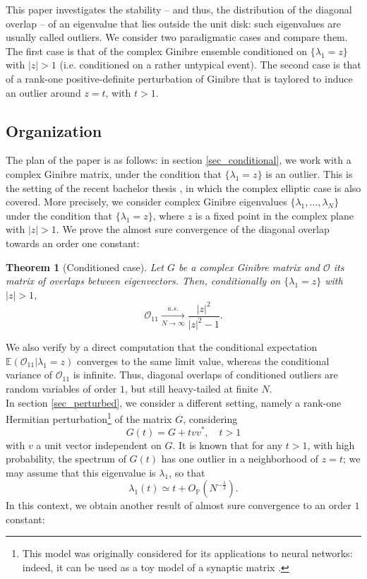 \documentclass[12pt,a4paper]{amsart}
\theoremstyle{plain} %
\newtheorem{theorem}{Theorem}
\newcommand{\E}{\mathbb{E}}
\newcommand{\PP}{\mathbb{P}}
\newcommand{\Ov}{\mathscr{O}}
\newcommand{\la}{\lambda}
\begin{document}
This paper investigates the stability -- and thus, the distribution of the diagonal overlap -- of an eigenvalue that lies outside the unit disk: such eigenvalues are usually called outliers. We consider two paradigmatic cases and compare them. The first case is that of the complex Ginibre ensemble conditioned on $\{ \la_1 = z \}$ with $|z|>1$ (i.e. conditioned on a rather untypical event). The second case is that of a rank-one positive-definite perturbation of Ginibre that is taylored to induce an outlier around $z=t$, with $t>1$. \\

\subsection{Organization}
The plan of the paper is as follows:
in section \ref{sec_conditional}, we work with a complex Ginibre matrix, under the condition that $\{\la_1=z\}$ is an outlier. This is the setting of the recent bachelor thesis \cite{Thomas2026}, in which the complex elliptic case is also covered. More precisely, we consider complex Ginibre eigenvalues $\{ \la_1, \dots, \la_N \}$ under the condition that $\{ \la_1 = z \}$, where $z$ is a fixed point in the complex plane with $|z|>1$. We prove the almost sure convergence of the diagonal overlap towards an order one constant:

\begin{theorem}[Conditioned case]\label{thm_conditional}
    Let $G$ be a complex Ginibre matrix and $\Ov$ its matrix of overlaps between eigenvectors. Then, conditionally on $\{\la_1 = z\}$ with $|z|>1$, 
    $$
    \mathscr{O}_{11} \xrightarrow[N \rightarrow \infty]{a.s.} \frac{|z|^2}{|z|^2-1}.
    $$
\end{theorem}
We also verify by a direct computation that the conditional expectation $\E \left( \Ov_{11} | \la_1 = z \right)$ converges to the same limit value, whereas the conditional variance of $\Ov_{11}$ is infinite. Thus, diagonal overlaps of conditioned outliers are random variables of order $1$, but still heavy-tailed at finite $N$. \\

In section \ref{sec_perturbed}, we consider a different setting, namely a rank-one Hermitian perturbation\footnote{This model was originally considered for its applications to neural networks: indeed, it can be used as a toy model of a synaptic matrix \cite{RajanAbbott}.} of the matrix $G$, considering
\begin{equation}\label{eq:rank_one_pert}
G(t) = G + t vv^*, \quad t>1
\end{equation}
with $v$ a unit vector independent on $G$.
It is known \cites{Chafai,Tao2013} that for any $t>1$, with high probability, the spectrum of $G(t)$ has one outlier in a neighborhood of $z = t$; we may assume that this eigenvalue is $\la_1$, so that
$$
\la_1 (t) \simeq t  + O_{\PP}(N^{-\frac12}).
$$
In this context, we obtain another result of almost sure convergence to an order $1$ constant:
\end{document}
